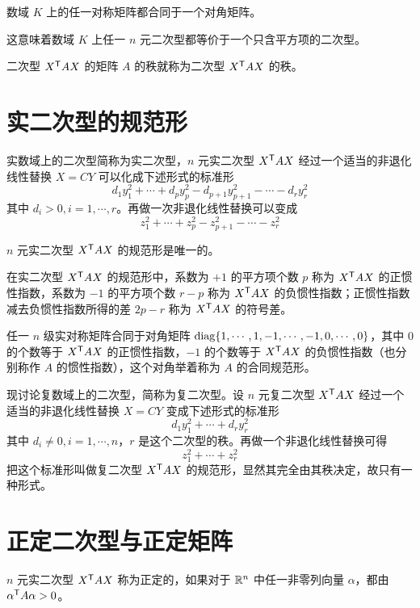 \begin{theorem}
    数域 $K$ 上的任一对称矩阵都合同于一个对角矩阵。
\end{theorem}

这意味着数域 $K$ 上任一 $n$ 元二次型都等价于一个只含平方项的二次型。

二次型 ${X}^\mathsf{T}AX$ 的矩阵 $A$ 的秩就称为二次型 ${X}^\mathsf{T}AX$ 的秩。

\section{实二次型的规范形}

实数域上的二次型简称为实二次型，$n$ 元实二次型 ${X}^\mathsf{T}AX$ 经过一个适当的非退化线性替换 $X = CY$ 可以化成下述形式的标准形
\[d_1y_1^2+\cdots+d_py_p^2-d_{p+1}y_{p+1}^2-\cdots-d_ry_r^2\]
其中 $d_i>0,i=1,\cdots,r$。再做一次非退化线性替换可以变成
\[z_1^2+\cdots+z_p^2-z_{p+1}^2-\cdots-z_r^2\]

\begin{theorem}
    $n$ 元实二次型 ${X}^\mathsf{T}AX$ 的规范形是唯一的。
\end{theorem}

\begin{definition}
    在实二次型 ${X}^\mathsf{T}AX$ 的规范形中，系数为 $+1$ 的平方项个数 $p$ 称为 ${X}^\mathsf{T}AX$ 的正惯性指数，系数为 $-1$ 的平方项个数 $r-p$ 称为 ${X}^\mathsf{T}AX$ 的负惯性指数；正惯性指数减去负惯性指数所得的差 $2p-r$ 称为 ${X}^\mathsf{T}AX$ 的符号差。
\end{definition}

任一 $n$ 级实对称矩阵合同于对角矩阵 $\operatorname{diag}\{1,\cdots,1,-1,\cdots,-1,0,\cdots,0\}$，其中 $0$ 的个数等于 ${X}^\mathsf{T}AX$ 的正惯性指数，$-1$ 的个数等于 ${X}^\mathsf{T}AX$ 的负惯性指数（也分别称作 $A$ 的惯性指数），这个对角举着称为 $A$ 的合同规范形。

现讨论复数域上的二次型，简称为复二次型。设 $n$ 元复二次型 ${X}^\mathsf{T}AX$ 经过一个适当的非退化线性替换 $X = CY$ 变成下述形式的标准形
\[d_1y_1^2+\cdots+d_ry_r^2\]
其中 $d_i\ne 0,i=1,\cdots,n$，$r$ 是这个二次型的秩。再做一个非退化线性替换可得
\[z_1^2+\cdots+z_r^2\]
把这个标准形叫做复二次型 ${X}^\mathsf{T}AX$ 的规范形，显然其完全由其秩决定，故只有一种形式。

\section{正定二次型与正定矩阵}

\begin{definition}
    $n$ 元实二次型 ${X}^\mathsf{T}AX$ 称为正定的，如果对于 $\mathbb{R}^n$ 中任一非零列向量 $\alpha$，都由 ${\alpha}^\mathsf{T}A\alpha>0$。
\end{definition}

